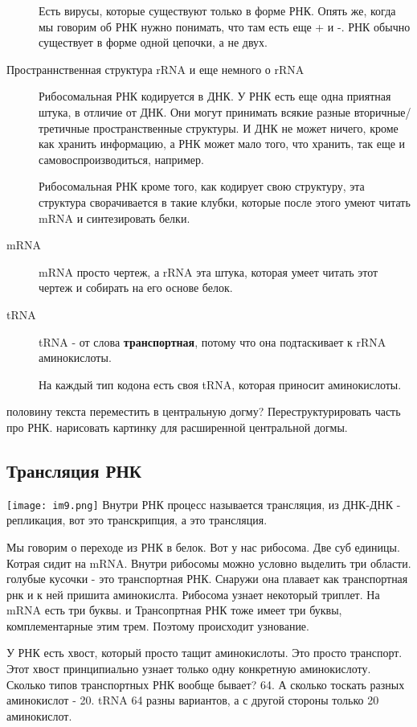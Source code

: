 \begin{description}
Есть вирусы, которые существуют только в форме РНК. Опять же,
когда мы говорим об РНК нужно понимать, что там есть еще + и -. РНК
обычно существует в форме одной цепочки, а не двух.

\item[Пространнственная структура rRNA и еще немного о rRNA]
Рибосомальная РНК кодируется в ДНК. У РНК есть
еще одна приятная штука, в отличие от ДНК. Они могут
принимать всякие разные вторичные/третичные пространственные структуры.
И ДНК не может ничего, кроме как хранить информацию, а РНК может
мало того, что хранить, так еще и самовоспроизводиться, например.

Рибосомальная РНК кроме того, как кодирует свою структуру, эта структура 
сворачивается в такие клубки, которые после этого умеют 
читать mRNA и синтезировать белки.

\item[mRNA]
mRNA просто чертеж, а rRNA эта штука, которая умеет читать этот чертеж и собирать
на его основе белок.

\item[tRNA]
tRNA - от слова \textbf{транспортная}, потому что она подтаскивает к rRNA аминокислоты.

На каждый тип кодона есть своя tRNA, которая приносит аминокислоты.
\end{description}

\TODO половину текста переместить в центральную догму? Переструктурировать часть про РНК.
\TODO нарисовать картинку для расширенной центральной догмы. 

\subsection{Трансляция РНК}
\texttt{[image: im9.png]}
Внутри РНК процесс называется трансляция, из ДНК-ДНК - репликация, 
вот это транскрипция, а это трансляция.

Мы говорим о переходе из РНК в белок. Вот у нас рибосома. Две суб единицы.
Котрая сидит на mRNA. Внутри рибосомы можно условно выделить
три области. голубые кусочки - это транспортная РНК. Снаружи она плавает
как транспортная рнк и к ней пришита аминокислта. Рибосома узнает
некоторый триплет. На mRNA есть три буквы. и Трансопртная РНК тоже имеет
три буквы, комплементарные этим трем. Поэтому происходит узнование.

У РНК есть хвост, который просто тащит аминокислоты. Это просто транспорт. Этот
хвост принципиально узнает только одну конкретную аминокислоту. Сколько типов
транспортных РНК вообще бывает? 64. А сколько тоскать разных аминокислот - 20.
tRNA 64 разны вариантов, а с другой стороны только 20 аминокислот.

